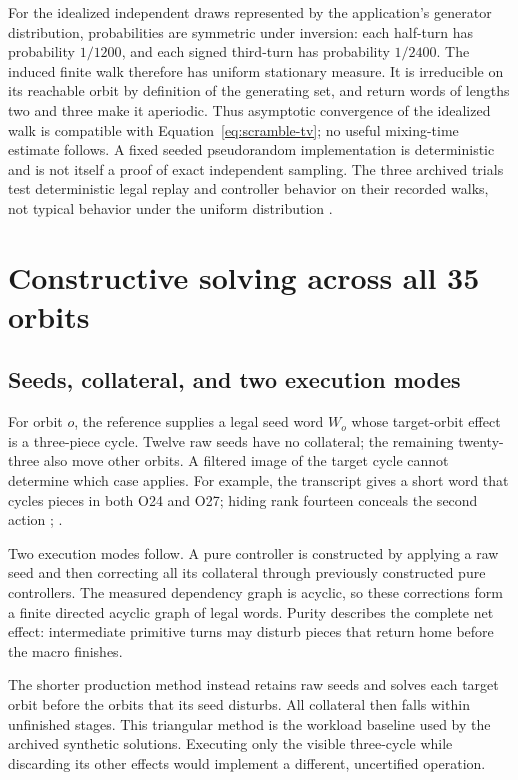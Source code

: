 \documentclass[a4paper,11pt]{article}
\begin{document}
For the idealized independent draws represented by the application's generator distribution, probabilities are symmetric under inversion: each half-turn has probability \(1/1200\), and each signed third-turn has probability \(1/2400\). The induced finite walk therefore has uniform stationary measure. It is irreducible on its reachable orbit by definition of the generating set, and return words of lengths two and three make it aperiodic. Thus asymptotic convergence of the idealized walk is compatible with Equation~\eqref{eq:scramble-tv}; no useful mixing-time estimate follows. A fixed seeded pseudorandom implementation is deterministic and is not itself a proof of exact independent sampling. The three archived trials test deterministic legal replay and controller behavior on their recorded walks, not typical behavior under the uniform distribution \cite{sourcecode}.


\section{Constructive solving across all 35 orbits}
\label{sec:5}

\subsection{Seeds, collateral, and two execution modes}

For orbit \(o\), the reference supplies a legal seed word \(W_{o}\) whose target-orbit effect is a three-piece cycle. Twelve raw seeds have no collateral; the remaining twenty-three also move other orbits. A filtered image of the target cycle cannot determine which case applies. For example, the transcript gives a short word that cycles pieces in both O24 and O27; hiding rank fourteen conceals the second action \cite[pp.~7--8]{transcript}; \cite{algorithms}.

Two execution modes follow. A pure controller is constructed by applying a raw seed and then correcting all its collateral through previously constructed pure controllers. The measured dependency graph is acyclic, so these corrections form a finite directed acyclic graph of legal words. Purity describes the complete net effect: intermediate primitive turns may disturb pieces that return home before the macro finishes.

The shorter production method instead retains raw seeds and solves each target orbit before the orbits that its seed disturbs. All collateral then falls within unfinished stages. This triangular method is the workload baseline used by the archived synthetic solutions. Executing only the visible three-cycle while discarding its other effects would implement a different, uncertified operation.
\end{document}
